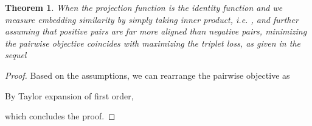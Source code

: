 \documentclass{article}
\newtheorem{theorem}{Theorem}[section]
\theoremstyle{remark}
\begin{document}
\begin{theorem}
\label{thm:objective-triplet-loss}
When the projection function  is the identity function and we measure embedding similarity by simply taking inner product, i.e. , and further assuming that positive pairs are far more aligned than negative pairs, minimizing the pairwise objective  coincides with maximizing the triplet loss, as given in the sequel

\end{theorem}

\begin{proof}
Based on the assumptions, we can rearrange the pairwise objective as

By Taylor expansion of first order,

which concludes the proof.
\end{proof}
 
\small


\end{document}
